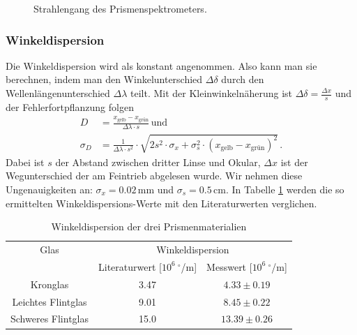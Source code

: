 \documentclass[12pt,a4paper,titlepage,headinclude,bibtotoc]{scrartcl}
\begin{document}
\begin{figure}[!htb]
	\def\svgwidth{0.8\linewidth}
	
	\caption{Strahlengang des Prismenspektrometers.  \protect \footnotemark[1]}
	\label{fig:Strahlengang2}
\end{figure}

\subsubsection{Winkeldispersion}
Die Winkeldispersion wird als konstant angenommen.
Also kann man sie berechnen, indem man den Winkelunterschied $\Delta\delta$ durch den Wellenlängenunterschied $\Delta\lambda$ teilt.
Mit der Kleinwinkelnäherung ist $\Delta\delta=\frac{\Delta x}{s}$ und der Fehlerfortpflanzung folgen
\begin{align}
	D&=\frac{x_\text{gelb} - x_\text{grün}}{\Delta\lambda \cdot s}\,\text{und}\\
\sigma_{D}&=\frac{1}{\Delta\lambda \cdot s^{2}} \cdot \sqrt{2s^{2} \cdot \sigma_{x} + \sigma_{s}^{2} \cdot \left(x_\text{gelb} - x_\text{grün}\right)^{2}}\,.
\end{align}
Dabei ist $s$ der Abstand zwischen dritter Linse und Okular, $\Delta x$ ist der Wegunterschied der am Feintrieb abgelesen wurde.
Wir nehmen diese Ungenauigkeiten an: $\sigma_x=0.02\,$mm und $\sigma_s=0.5\,$cm.
In Tabelle \ref{tab:Dispersion} werden die so ermittelten Winkeldispersions-Werte mit den Literaturwerten verglichen.
\begin{table}[!htb]
	\centering
	\begin{tabular}{|c|c|c|}
		\hline
		Glas & \multicolumn{2}{c|}{Winkeldispersion}\\		
		 & Literaturwert [$10^6~^\circ$/m] & Messwert [$10^6~^\circ$/m]\\
		\hline
		Kronglas& 3.47 & $4.33 \pm 0.19$ \\
		Leichtes Flintglas & 9.01 & $8.45 \pm 0.22$ \\
		Schweres Flintglas & 15.0 & $13.39 \pm 0.26$ \\
		\hline
	\end{tabular}
	\caption{Winkeldispersion der drei Prismenmaterialien}
	\label{tab:Dispersion}
\end{table}
\end{document}
